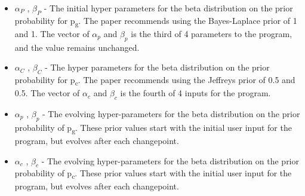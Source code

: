 \documentclass{article}
\begin{document}
\begin{itemize}
\item $\alpha_P$ , $\beta_P$ - The initial hyper parameters for the beta distribution on the prior probability for p\textsubscript{g}. The paper recommends using the Bayes-Laplace prior of 1 and 1. The vector of $\alpha_p$ and $\beta_p$ is the third of 4 parameters to the program, and the value remains unchanged.

\item $\alpha_C$ , $\beta_C$ - The hyper parameters for  the beta distribution on the prior probability for p\textsubscript{c}. The paper recommends using the Jeffreys prior of 0.5 and 0.5. The vector of $\alpha_c$ and $\beta_c$ is the fourth of 4 inputs for the program.

\item $\alpha_p$ , $\beta_p$ - The evolving hyper-parameters for the beta distribution on the prior probability of p\textsubscript{g}.     These prior values start with the initial user input for the program, but evolves after each changepoint. 

\item $\alpha_c$ , $\beta_c$ - The evolving hyper-parameters for the beta distribution on the prior probability of p\textsubscript{c}.     These prior values start with the initial user input for the program, but evolves after each changepoint. 
 
\end{itemize}
\end{document}
